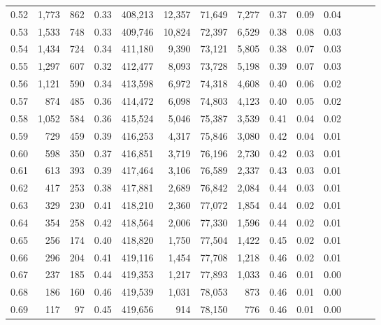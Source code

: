 \begin{tabular}{rrrrrrrrrrrrrr}
0.52 &   1,773 &    862 &  0.33 &  408,213 &   12,357 &  71,649 &   7,277 &  0.37 &  0.09 &      0.04 \\
0.53 &   1,533 &    748 &  0.33 &  409,746 &   10,824 &  72,397 &   6,529 &  0.38 &  0.08 &      0.03 \\
0.54 &   1,434 &    724 &  0.34 &  411,180 &    9,390 &  73,121 &   5,805 &  0.38 &  0.07 &      0.03 \\
0.55 &   1,297 &    607 &  0.32 &  412,477 &    8,093 &  73,728 &   5,198 &  0.39 &  0.07 &      0.03 \\
0.56 &   1,121 &    590 &  0.34 &  413,598 &    6,972 &  74,318 &   4,608 &  0.40 &  0.06 &      0.02 \\
0.57 &     874 &    485 &  0.36 &  414,472 &    6,098 &  74,803 &   4,123 &  0.40 &  0.05 &      0.02 \\
0.58 &   1,052 &    584 &  0.36 &  415,524 &    5,046 &  75,387 &   3,539 &  0.41 &  0.04 &      0.02 \\
0.59 &     729 &    459 &  0.39 &  416,253 &    4,317 &  75,846 &   3,080 &  0.42 &  0.04 &      0.01 \\
0.60 &     598 &    350 &  0.37 &  416,851 &    3,719 &  76,196 &   2,730 &  0.42 &  0.03 &      0.01 \\
0.61 &     613 &    393 &  0.39 &  417,464 &    3,106 &  76,589 &   2,337 &  0.43 &  0.03 &      0.01 \\
0.62 &     417 &    253 &  0.38 &  417,881 &    2,689 &  76,842 &   2,084 &  0.44 &  0.03 &      0.01 \\
0.63 &     329 &    230 &  0.41 &  418,210 &    2,360 &  77,072 &   1,854 &  0.44 &  0.02 &      0.01 \\
0.64 &     354 &    258 &  0.42 &  418,564 &    2,006 &  77,330 &   1,596 &  0.44 &  0.02 &      0.01 \\
0.65 &     256 &    174 &  0.40 &  418,820 &    1,750 &  77,504 &   1,422 &  0.45 &  0.02 &      0.01 \\
0.66 &     296 &    204 &  0.41 &  419,116 &    1,454 &  77,708 &   1,218 &  0.46 &  0.02 &      0.01 \\
0.67 &     237 &    185 &  0.44 &  419,353 &    1,217 &  77,893 &   1,033 &  0.46 &  0.01 &      0.00 \\
0.68 &     186 &    160 &  0.46 &  419,539 &    1,031 &  78,053 &     873 &  0.46 &  0.01 &      0.00 \\
0.69 &     117 &     97 &  0.45 &  419,656 &      914 &  78,150 &     776 &  0.46 &  0.01 &      0.00 \\

\end{tabular}

